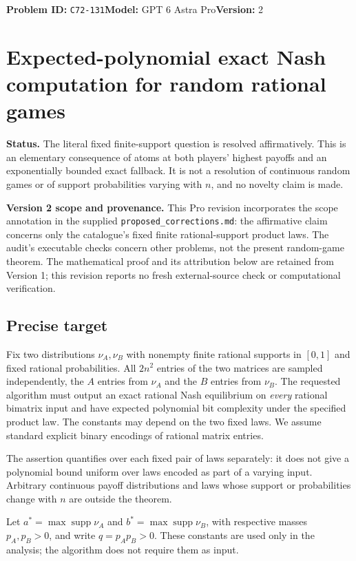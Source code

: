 \documentclass[11pt,a4paper]{article}
\newcommand{\supp}{\operatorname{supp}}
\begin{document}
\noindent\textbf{Problem ID:} \texttt{C72-131}\quad\textbf{Model:} GPT 6 Astra Pro\quad\textbf{Version:} 2\par
\section*{Expected-polynomial exact Nash computation for random rational games}

\textbf{Status.} The literal fixed finite-support question is resolved affirmatively. This is an elementary consequence of atoms at both players' highest payoffs and an exponentially bounded exact fallback. It is not a resolution of continuous random games or of support probabilities varying with $n$, and no novelty claim is made.

\textbf{Version 2 scope and provenance.} This Pro revision incorporates the scope annotation in the supplied \texttt{proposed\_corrections.md}: the affirmative claim concerns only the catalogue's fixed finite rational-support product laws. The audit's executable checks concern other problems, not the present random-game theorem. The mathematical proof and its attribution below are retained from Version 1; this revision reports no fresh external-source check or computational verification.

\subsection*{Precise target}
Fix two distributions $\nu_A,\nu_B$ with nonempty finite rational supports in $[0,1]$ and fixed rational probabilities. All $2n^2$ entries of the two matrices are sampled independently, the $A$ entries from $\nu_A$ and the $B$ entries from $\nu_B$. The requested algorithm must output an exact rational Nash equilibrium on \emph{every} rational bimatrix input and have expected polynomial bit complexity under the specified product law. The constants may depend on the two fixed laws. We assume standard explicit binary encodings of rational matrix entries.

The assertion quantifies over each fixed pair of laws separately: it does not give a polynomial bound uniform over laws encoded as part of a varying input. Arbitrary continuous payoff distributions and laws whose support or probabilities change with $n$ are outside the theorem.

Let $a^*=\max\supp\nu_A$ and $b^*=\max\supp\nu_B$, with respective masses $p_A,p_B>0$, and write $q=p_Ap_B>0$. These constants are used only in the analysis; the algorithm does not require them as input.
\end{document}
